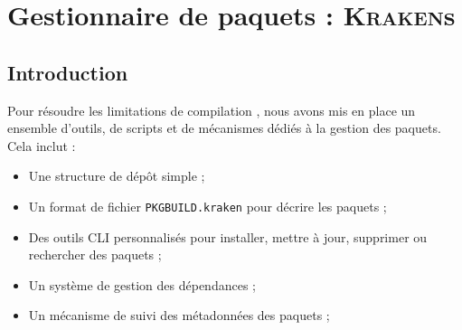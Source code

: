\chapter{ Gestionnaire de paquets : \textsc{Kraken}s}
\minitoc
\clearpage

\label{sec:pkgmgr}

\section{Introduction}
\label{sec:intro}

Pour résoudre les limitations de compilation , nous avons mis en place un ensemble d'outils, de scripts et de mécanismes dédiés à la gestion des paquets.  
Cela inclut :
\begin{itemize}
    \item Une structure de dépôt simple ;
    \item Un format de fichier \texttt{PKGBUILD.kraken} pour décrire les paquets ;
    \item Des outils CLI personnalisés pour installer, mettre à jour, supprimer ou rechercher des paquets ;
    \item Un système de gestion des dépendances ;
    \item Un mécanisme de suivi des métadonnées des paquets ;
\end{itemize}

